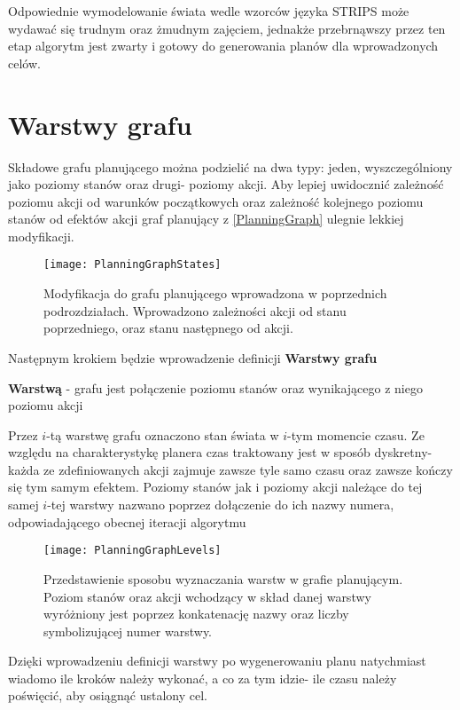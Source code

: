     
    Odpowiednie wymodelowanie świata wedle wzorców języka STRIPS może wydawać się trudnym oraz żmudnym zajęciem, jednakże przebrnąwszy 
    przez ten etap algorytm jest zwarty i gotowy do generowania planów dla wprowadzonych celów.


\section{Warstwy grafu}
    Składowe grafu planującego można podzielić na dwa typy: jeden, wyszczególniony jako poziomy stanów oraz drugi- poziomy akcji. Aby lepiej 
    uwidocznić zależność poziomu akcji od warunków początkowych oraz zależność kolejnego poziomu stanów od efektów akcji graf planujący 
    z \ref{PlanningGraph} ulegnie lekkiej modyfikacji. 
    \begin{figure}[H]
        \texttt{[image: PlanningGraphStates]}
        \centering
        \caption{Modyfikacja do grafu planującego wprowadzona w poprzednich podrozdziałach. Wprowadzono zależności akcji od stanu poprzedniego, oraz stanu 
        następnego od akcji.}
        \label{PlanningGraphStates}
    \end{figure}
    Następnym krokiem będzie wprowadzenie definicji \textbf{Warstwy grafu}
    \begin{definition}
        \label{Warstwa}
        \textbf{Warstwą} - grafu jest połączenie poziomu stanów oraz wynikającego z niego poziomu akcji
    \end{definition}
    Przez $i$-tą warstwę grafu oznaczono stan świata w $i$-tym momencie czasu. Ze względu na charakterystykę planera czas traktowany jest w sposób dyskretny-
    każda ze zdefiniowanych akcji zajmuje zawsze tyle samo czasu oraz zawsze kończy się tym samym efektem. Poziomy stanów jak i poziomy akcji 
    należące do tej samej $i$-tej warstwy nazwano poprzez dołączenie do ich nazwy numera, odpowiadającego obecnej iteracji algorytmu
    \begin{figure}[H]
        \texttt{[image: PlanningGraphLevels]}
        \centering
        \caption{Przedstawienie sposobu wyznaczania warstw w grafie planującym. Poziom stanów oraz akcji wchodzący w skład danej warstwy 
        wyróżniony jest poprzez konkatenację nazwy oraz liczby symbolizującej numer warstwy.}
        \label{PlanningGraphLevels}
    \end{figure}
    Dzięki wprowadzeniu definicji warstwy po wygenerowaniu 
    planu natychmiast wiadomo ile kroków należy wykonać, a co za tym idzie- ile czasu należy poświęcić, aby osiągnąć ustalony cel. 

